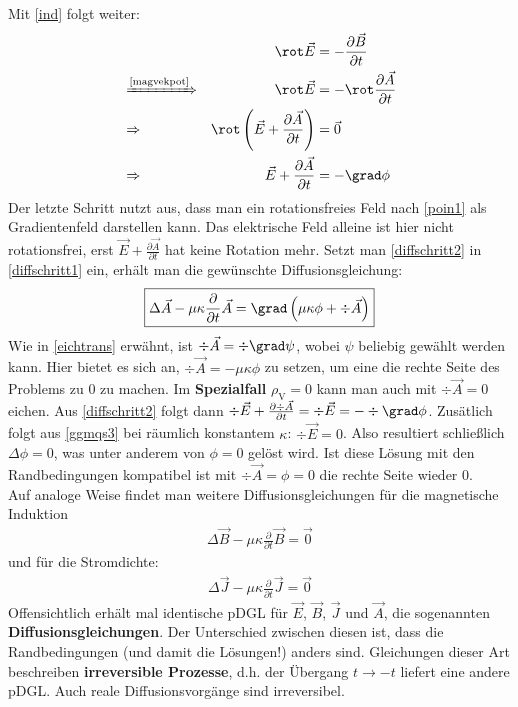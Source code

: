 					       Mit \ref{ind} folgt weiter:
					       \begin{align}
					       && \rot \vec{E} &= -\frac{\partial\vec{B} }{\partial t}  \nonumber\\
					        &\xRightarrow{\text{\ref{magvekpot}}}& \rot \vec{E} &= -\rot \frac{\partial  \vec{A}}{\partial t}\nonumber \\
					        &\Rightarrow& \rot \left( \vec{E} + \frac{\partial  \vec{A}}{\partial t}\right) &= \vec{0} \nonumber\\
					        &\Rightarrow&  \vec{E} + \frac{\partial \vec{A}}{\partial t} &= - \grad \phi \label{diffschritt2}
				        \end{align}
				        Der letzte Schritt nutzt aus, dass man ein rotationsfreies Feld nach \ref{poin1} als Gradientenfeld darstellen kann. Das elektrische Feld alleine ist hier nicht rotationsfrei, erst $\vec{E}+ \frac{\partial  \vec{A}}{\partial t}$ hat keine Rotation mehr. Setzt man \ref{diffschritt2} in \ref{diffschritt1} ein, erhält man die gewünschte Diffusionsgleichung:
				        \begin{equation}
				         \boxed{\Delta  \vec{A} - \mu\kappa \frac{\partial }{\partial t} \vec{A} =\grad \left( \mu\kappa \phi +\div  \vec{A} \right)  }
				         				        \end{equation}
			   Wie in \ref{eichtrans} erwähnt, ist $\div  \vec{A}=\div\grad\psi$, wobei $\psi$ beliebig gewählt werden kann. Hier bietet es sich an, $\div  \vec{A}=-\mu\kappa \phi$ zu setzen, um eine die rechte Seite des Problems zu 0 zu machen. Im \textbf{Spezialfall} $\rho_\text{V}=0$ kann man auch mit $\div\vec{A}=0$ eichen. Aus \ref{diffschritt2} folgt dann $\div \vec{E} + \frac{\partial \div\vec{A}}{\partial t} = \div \vec{E} = - \div\grad \phi  $. Zusätlich folgt aus \ref{ggmqs3} bei räumlich konstantem $\kappa$: $\div\vec{E}=0$. Also resultiert schließlich $\Delta\phi=0$, was unter anderem von $\phi=0$ gelöst wird. Ist diese Lösung mit den Randbedingungen kompatibel ist mit $\div\vec{A}=\phi=0$ die rechte Seite wieder 0.\\
			   Auf analoge Weise findet man weitere Diffusionsgleichungen für die magnetische Induktion
			        \begin{equation}\begin{split}\label{diffB}
					        \boxed{\Delta \vec{B}  - \mu\kappa \frac{\partial }{\partial t}\vec{B}  = \vec{0} }
				        \end{split}\end{equation}
			   und für die Stromdichte:
			        \begin{equation}\begin{split}
					        \boxed{\Delta \vec{J} - \mu\kappa \frac{\partial }{\partial t}\vec{J} = \vec{0} }
				        \end{split}\end{equation}
			   Offensichtlich erhält mal identische pDGL für $\vec{E}$, $\vec{B} $, $\vec{J}$ und $ \vec{A}$, die sogenannten \textbf{Diffusionsgleichungen}.
			   Der Unterschied zwischen diesen ist, dass die Randbedingungen (und damit die Lösungen!) anders sind.  Gleichungen dieser Art beschreiben \textbf{irreversible Prozesse}, d.h. der Übergang  $t \to -t$ liefert eine andere pDGL. Auch reale Diffusionsvorgänge sind irreversibel.
